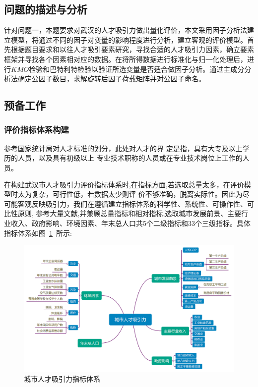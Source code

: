 \documentclass{whutmod}
\begin{document}
	\subsection{问题的描述与分析}
	针对问题一，本题要求对武汉的人才吸引力做出量化评价，本文采用因子分析法建立模型，将通过不同的因子对变量的影响程度进行分析，建立客观的评价模型。首先根据题目要求和以往人才吸引要素研究，寻找合适的人才吸引力因素，确立要素框架并寻找各个因素相对应的数据。在将所得数据进行标准化与归一化处理后，进行$KMO$检验和巴特利特检验以验证所选变量是否适合做因子分析。通过主成分分析法确定公因子数目，求解旋转后因子荷载矩阵并对公因子命名。


		\subsection{预备工作}
		\subsubsection{评价指标体系构建}
		参考国家统计局对人才标准的划分，此处对人才的界 定是指，具有大专及以上学历的人员，以及具有初级以上 专业技术职称的人员或在专业技术岗位上工作的人员。
		
		在构建武汉市人才吸引力评价指标体系时,在指标方面,若选取总量太多，在评价模型时太为复杂，可行性低，若数据太少则评 价不够准确，脱离实际性。因此为尽可能客观反映吸引力，我们在遵循建立指标体系的科学性、系统性、可操作性、可比性原则, 参考大量文献,并兼顾总量指标和相对指标,选取城市发展前景、主要行业收入、政府影响、环境因素、年末总人口共5个二级指标和33个三级指标。具体指标体系如图~\ref{lct}~所示: 	
		\begin{figure}[H]
			\centering
			\includegraphics[width=\textwidth]{figures/clt.png}
			\caption{城市人才吸引力指标体系}\label{lct}
		\end{figure}  
		
\end{document}
